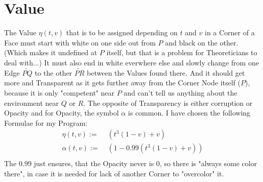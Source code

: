 \section{Value}
	The Value $\eta(t, v)$ that is to be assigned depending on $t$ and $v$ in a Corner of a Face must start with white on one side out from $P$ and black on the other. (Which makes it undefined at $P$ itself, but that is a problem for Theoreticians to deal with...) It must also end in white everwhere else and slowly change from one Edge $\widetilde{PQ}$ to the other $\widetilde{PR}$ between the Values found there. And it should get more and Transparent as it gets further away from the Corner Node itself ($P$), because it is only "competent" near $P$ and can't tell us anything about the environment near $Q$ or $R$. The opposite of Transparency is either corruption or Opacity and for Opacity, the symbol $\alpha$ is common. I have chosen the following Formulae for my Program:
	$$\begin{aligned}
		\eta(t, v)   :=&\phantom{.}          (t^3(1 - v) + v) \\
		\alpha(t, v) :=&\phantom{.} (1 - 0.99(t^3(1 - v) + v)) \\
	\end{aligned}$$
	The 0.99 just ensures, that the Opacity never is 0, so there is "always some color there", in case it is needed for lack of another Corner to "overcolor" it.
